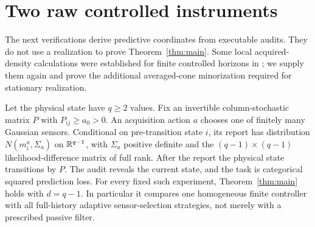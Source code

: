 \section{Two raw controlled instruments}\label{sec:realizations}
The next verifications derive predictive coordinates from executable audits. They do not use a realization to prove Theorem~\ref{thm:main}. Some local acquired-density calculations were established for finite controlled horizons in \cite{GTFControlled}; we supply them again and prove the additional averaged-cone minorization required for stationary realization.

\begin{theorem}\label{thm:gaussian}
Let the physical state have $q\ge2$ values. Fix an invertible column-stochastic matrix $P$ with $P_{ij}\ge a_0>0$. An acquisition action $a$ chooses one of finitely many Gaussian sensors. Conditional on pre-transition state $i$, its report has distribution $N(m_i^a,\Sigma_a)$ on $\mathbb R^{q-1}$, with $\Sigma_a$ positive definite and the $(q-1)\times(q-1)$ likelihood-difference matrix of full rank. After the report the physical state transitions by $P$. The audit reveals the current state, and the task is categorical squared prediction loss. For every fixed such experiment, Theorem~\ref{thm:main} holds with $d=q-1$. In particular it compares one homogeneous finite controller with all full-history adaptive sensor-selection strategies, not merely with a prescribed passive filter.
\end{theorem}
